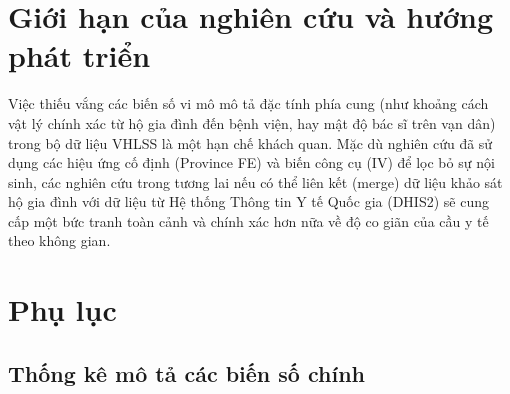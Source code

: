 \documentclass[12pt,a4paper]{article}
\begin{document}
\section{Giới hạn của nghiên cứu và hướng phát triển} 
	
Việc thiếu vắng các biến số vi mô mô tả đặc tính phía cung (như khoảng cách vật lý chính xác từ hộ gia đình đến bệnh viện, hay mật độ bác sĩ trên vạn dân) trong bộ dữ liệu VHLSS là một hạn chế khách quan. Mặc dù nghiên cứu đã sử dụng các hiệu ứng cố định (Province FE) và biến công cụ (IV) để lọc bỏ sự nội sinh, các nghiên cứu trong tương lai nếu có thể liên kết (merge) dữ liệu khảo sát hộ gia đình với dữ liệu từ Hệ thống Thông tin Y tế Quốc gia (DHIS2) sẽ cung cấp một bức tranh toàn cảnh và chính xác hơn nữa về độ co giãn của cầu y tế theo không gian.


\newpage
\appendix
\section{Phụ lục}

\subsection{Thống kê mô tả các biến số chính}
\end{document}
